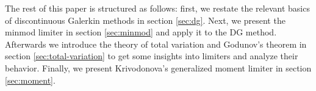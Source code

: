 The rest of this paper is structured as follows: first, we restate the relevant basics of discontinuous Galerkin methods in section \ref{sec:dg}.
Next, we present the minmod limiter in section \ref{sec:minmod} and apply it to the DG method.
Afterwards we introduce the theory of total variation and Godunov's theorem in section \ref{sec:total-variation} to get some insights into limiters and analyze their behavior.
Finally, we present Krivodonova's generalized moment limiter in section \ref{sec:moment}.

